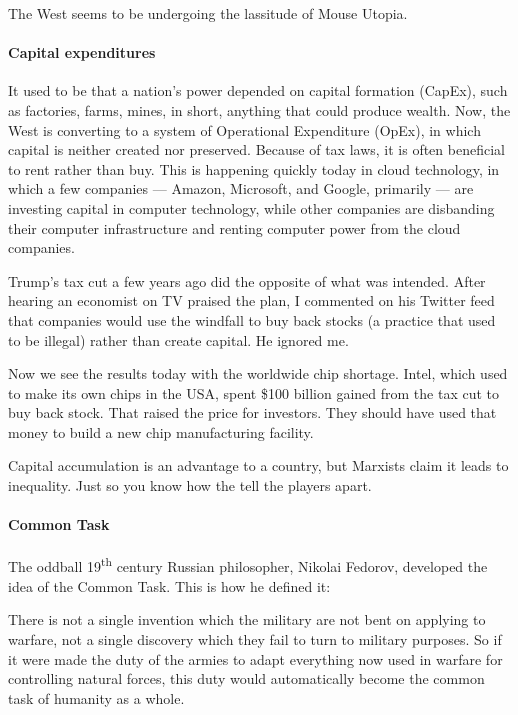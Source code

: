 The West seems to be undergoing the lassitude of Mouse Utopia.

\paragraph{Capital expenditures}


It used to be that a nation's power depended on capital formation (CapEx), such as factories, farms, mines, in short, anything that could produce wealth. Now, the West is converting to a system of Operational Expenditure (OpEx), in which capital is neither created nor preserved. Because of tax laws, it is often beneficial to rent rather than buy. This is happening quickly today in cloud technology, in which a few companies --- Amazon, Microsoft, and Google, primarily --- are investing capital in computer technology, while other companies are disbanding their computer infrastructure and renting computer power from the cloud companies.

Trump's tax cut a few years ago did the opposite of what was intended. After hearing an economist on TV praised the plan, I commented on his Twitter feed that companies would use the windfall to buy back stocks (a practice that used to be illegal) rather than create capital. He ignored me.

Now we see the results today with the worldwide chip shortage. Intel, which used to make its own chips in the USA, spent \$100 billion gained from the tax cut to buy back stock. That raised the price for investors. They should have used that money to build a new chip manufacturing facility.

Capital accumulation is an advantage to a country, but Marxists claim it leads to inequality. Just so you know how the tell the players apart.

\paragraph{Common Task}


The oddball 19\textsuperscript{th} century Russian philosopher, Nikolai Fedorov, developed the idea of the Common Task. This is how he defined it:

\begin{quotex}
There is not a single invention which the military are not bent on applying to warfare, not a single discovery which they fail to turn to military purposes. So if it were made the duty of the armies to adapt everything now used in warfare for controlling natural forces, this duty would automatically become the common task of humanity as a whole.
\end{quotex}


